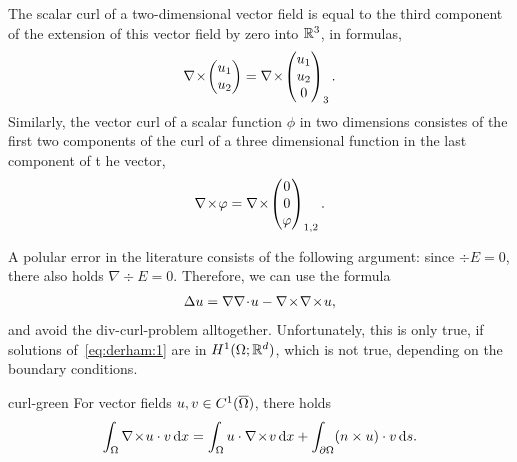 \begin{remark}
  The scalar curl of a two-dimensional vector field is equal to the
  third component of the extension of this vector field by zero into
  $\mathbb R^3$, in formulas,
  \begin{gather*}
    \nabla\!\times\!
    \begin{pmatrix}
      u_1\\u_2
    \end{pmatrix}
    =
    \nabla\!\times\!
    \begin{pmatrix}
      u_1\\u_2\\0
    \end{pmatrix}_3.
  \end{gather*}
  Similarly, the vector curl of a scalar function $\phi$ in two dimensions
  consistes of the first two components of the curl of a three
  dimensional function in the last component of t he vector,
  \begin{gather*}
    \nabla\!\times\! \varphi = \nabla\!\times\!
    \begin{pmatrix}
      0\\0\\\varphi
    \end{pmatrix}_{1,2}.
  \end{gather*}
\end{remark}
\begin{remark}
  A polular error in the literature consists of the following
  argument: since $\div E = 0$, there also holds $\nabla \div E =
  0$. Therefore, we can use the formula
  \begin{gather*}
    \Delta u = \nabla\nabla\!\cdot\! u - \nabla\!\times\!\nabla\!\times\! u,
  \end{gather*}
  and avoid the div-curl-problem alltogether. Unfortunately, this is
  only true, if solutions of~\eqref{eq:derham:1} are in
  $H^1(\Omega;\mathbb R^d)$, which is not true, depending on the boundary
  conditions.
\end{remark}

\begin{Lemma}{curl-green}
  For vector fields $u,v\in C^1(\overline{\Omega})$, there holds
  \begin{gather}
    \label{eq:derham:3}
    \int_{\Omega} \nabla\!\times\! u\cdot v\,\mathrm{d} x = \int_{\Omega} u\cdot\nabla\!\times\! v\,\mathrm{d} x
    + \int_{\partial\Omega} (n\times u) \cdot v \,\mathrm{d} s.
  \end{gather}
\end{Lemma}



